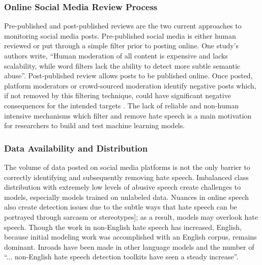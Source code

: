 \documentclass[conference]{IEEEtran}
\begin{document}
\subsubsection{Online Social Media Review Process}
Pre-published and post-published reviews are the two current approaches to monitoring social media posts. Pre-published social media is either human reviewed or put through a simple filter prior to posting online. One study’s authors write, “Human moderation of all content is expensive and lacks scalability, while word filters lack the ability to detect more subtle semantic abuse”\cite{b8}. Post-published review allows posts to be published online. Once posted, platform moderators or crowd-sourced moderation identify negative posts which, if not removed by this filtering technique, could have significant negative consequences for the intended targets \cite{b8}. The lack of reliable and non-human intensive mechanisms which filter and remove hate speech is a main motivation for researchers to build and test machine learning models.

\subsubsection{Data Availability and Distribution}
The volume of data posted on social media platforms is not the only barrier to correctly identifying and subsequently removing hate speech. Imbalanced class distribution with extremely low levels of abusive speech create challenges to models\cite{b8}, especially models trained on unlabeled data. Nuances in online speech also create detection issues due to the subtle ways that hate speech can be portrayed through sarcasm or stereotypes\cite{b9}]; as a result, models may overlook hate speech. Though the work in non-English hate speech has increased, English, because initial modeling work was accomplished with an English corpus, remains dominant. Inroads have been made in other language models and the number of “... non-English hate speech detection toolkits have seen a steady increase”\cite{b7}.
\end{document}
